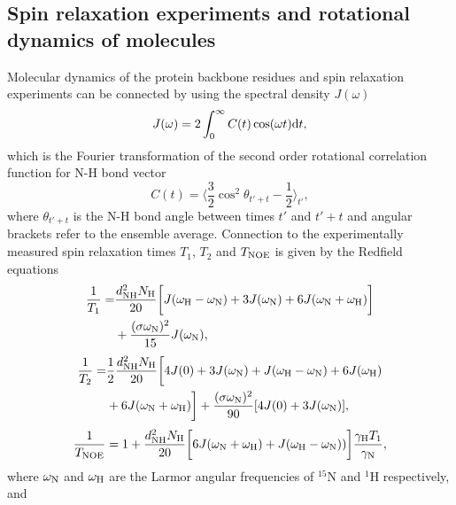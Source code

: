 \documentclass[pre,aps,floatfix,authordate1-4,twocolumn]{revtex4-1}
\begin{document}
\subsection{Spin relaxation experiments and rotational dynamics of molecules}
Molecular dynamics of the protein backbone residues and spin relaxation experiments can
be connected by using the spectral density $J(\omega)$ 
\begin{equation}\label{SPECTdens}
  J(\omega)=2\int_0^\infty C(t) \cos(\omega t) {\rm d}t,
\end{equation}
which is the Fourier transformation of the second order
rotational correlation function for N-H bond vector
\begin{equation}\label{CORRFdef}
  C(t)=\langle \frac{3}{2}\cos^2\theta_{t'+t}-\frac{1}{2} \rangle_{t'},
\end{equation}
where $\theta_{t'+t}$ is the N-H bond angle between times $t'$ and $t'+t$
and angular brackets refer to the ensemble average.
Connection to the experimentally measured spin relaxation times $T_1$, $T_2$
and $T_{\rm NOE}$ is given by the Redfield equations \cite{abragam,kay89}
\begin{equation}\label{R1}
  \begin{aligned}
  \frac{1}{T_1}= & \frac{d_{\rm{NH}}^2N_{\rm{H}}}{20}\bigg[J(\omega_{\rm{H}}-\omega_{\rm{N}})+3J(\omega_{\rm{N}})+6J(\omega_{\rm{N}}+\omega_{\rm{H}})\bigg] \\
        & +\frac{(\sigma \omega_{\rm{N}})^2}{15}J(\omega_{\rm{N}}),
  \end{aligned}
\end{equation}
\begin{equation}\label{R2}
    \begin{aligned}
  \frac{1}{T_2}= & \frac{1}{2}\frac{d_{\rm{NH}}^2N_{\rm{H}}}{20}\bigg[4J(0)+3J(\omega_{\rm{N}})+J(\omega_{\rm{H}}-\omega_{\rm{N}})+6J(\omega_{\rm{H}})  \\
    & +6J(\omega_{\rm{N}}+\omega_{\rm{H}})\bigg]+\frac{(\sigma \omega_{\rm{N}})^2}{90}[4J(0) +3J(\omega_{\rm{N}})],
    \end{aligned}
\end{equation}
\begin{equation}\label{NOE}
  \frac{1}{T_{\rm NOE}}=1+\frac{d_{\rm{NH}}^2N_{\rm{H}}}{20}\bigg[6J(\omega_{\rm{N}}+\omega_{\rm{H}})+J(\omega_{\rm{H}}-\omega_{\rm{N}}))\bigg]\frac{\gamma_{\rm{H}}T_1}{\gamma_{\rm{N}}},
\end{equation}
where $\omega_{\rm{N}}$ and $\omega_{\rm{H}}$ are the Larmor angular
frequencies of $^{15}$N and $^1$H respectively, and
\end{document}

